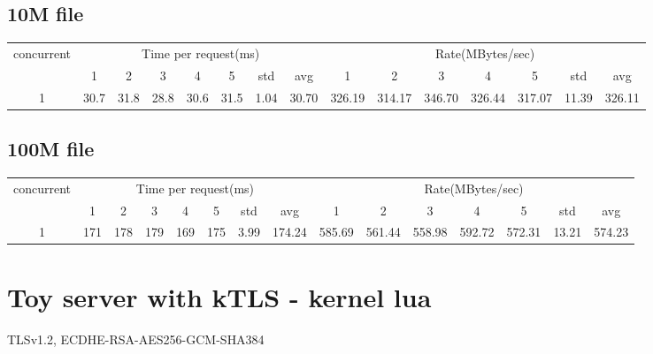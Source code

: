 \documentclass{article}
\begin{document}
\subsection*{10M file}
\begin{table}[H]
    \begin{tabular}{|c|c|c|c|c|c|c|c|c|c|c|c|c|c|c|}
        \hline
        \multirow{2}{*}{concurrent} & \multicolumn{7}{c|}{Time per request(ms)} & \multicolumn{7}{c|}{Rate(MBytes/sec)}                                                                                                   \\ \cline{2-15}
                                    & 1                                         & 2                                     & 3    & 4    & 5    & std  & avg   & 1      & 2      & 3      & 4      & 5      & std   & avg    \\ \hline
        1                           & 30.7                                      & 31.8                                  & 28.8 & 30.6 & 31.5 & 1.04 & 30.70 & 326.19 & 314.17 & 346.70 & 326.44 & 317.07 & 11.39 & 326.11 \\ \hline
    \end{tabular}
\end{table}
\subsection*{100M file}
\begin{table}[H]
    \begin{tabular}{|c|c|c|c|c|c|c|c|c|c|c|c|c|c|c|}
        \hline
        \multirow{2}{*}{concurrent} & \multicolumn{7}{c|}{Time per request(ms)} & \multicolumn{7}{c|}{Rate(MBytes/sec)}                                                                                                 \\ \cline{2-15}
                                    & 1                                         & 2                                     & 3   & 4   & 5   & std  & avg    & 1      & 2      & 3      & 4      & 5      & std   & avg    \\ \hline
        1                           & 171                                       & 178                                   & 179 & 169 & 175 & 3.99 & 174.24 & 585.69 & 561.44 & 558.98 & 592.72 & 572.31 & 13.21 & 574.23 \\ \hline
    \end{tabular}
\end{table}

\section*{Toy server with kTLS - kernel lua}
TLSv1.2, ECDHE-RSA-AES256-GCM-SHA384
\end{document}

